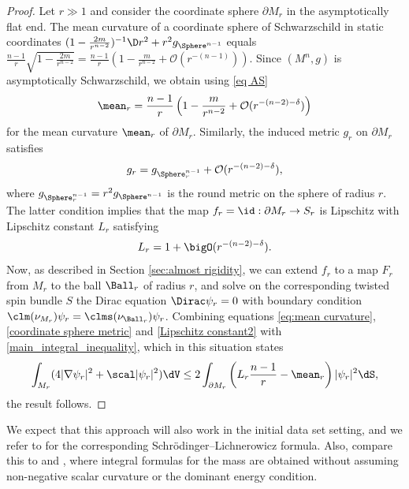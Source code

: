 \documentclass[a4paper,11pt]{amsart}
\numberwithin{equation}{section}
\begin{document}
\begin{proof}
Let $r\gg1$ and consider the coordinate sphere $\partial M_r$ in the asymptotically flat end. 
The mean curvature of a coordinate sphere of Schwarzschild in static coordinates $(1-\tfrac{2m}{r^{n-2}})^{-1}\D r^2+r^2g_{\Sphere^{n-1}}$ equals $\tfrac{n-1}r\sqrt{1-\tfrac{2m}{r^{n-2}}}=\tfrac{n-1}r(1-\frac{m}{r^{n-2}}+\mathcal O(r^{-(n-1)}))$.
Since $(M^n,g)$ is asymptotically Schwarzschild, we obtain using \eqref{eq AS} 
\begin{align}\label{eq:mean curvature}
    \mean_r=\frac{n-1}r\left(1-\frac{m}{r^{n-2}}+\mathcal O(r^{-(n-2)-\delta})      \right)
\end{align}
for the mean curvature $\mean_r$ of $\partial M_r$.
Similarly, the induced metric $g_r$ on $\partial M_r$ satisfies
\begin{align}\label{coordinate sphere metric}
 g_r=g_{\Sphere^{n-1}_r}+\mathcal O(r^{-(n-2)-\delta}),
\end{align}
where $g_{\Sphere^{n-1}_r}=r^2g_{\Sphere^{n-1}}$ is the round metric on the sphere of radius $r$.
The latter condition implies that the map $f_r=\id:\partial M_r\to S_r$ is Lipschitz with Lipschitz constant $L_r$ satisfying 
\begin{align}\label{Lipschitz constant2}
    L_r=1+\mathcal \bigO(r^{-(n-2)-\delta}).
\end{align}
Now, as described in Section \ref{sec:almost rigidity}, we can extend $f_r$ to a map $F_r$ from $M_r$ to the ball $\Ball_r$ of radius $r$, and solve on the corresponding twisted spin bundle \(S\) the Dirac equation $\Dirac \psi_r=0$ with boundary condition \(\clm(\nu_{M_r}) \psi_r =  \clms(\nu_{\Ball_r}) \psi_r \).
 Combining equations \eqref{eq:mean curvature}, \eqref{coordinate sphere metric} and \eqref{Lipschitz constant2} with \cref{main_integral_inequality}, which in this situation states
    \begin{align*}
        \int_{M_r}(4|\nabla \psi_r|^2+\scal|\psi_r|^2)\dV\le2\int_{\partial M_r}\left(L_r\frac{n-1}r-\mean_r\right)|\psi_r|^2\dS,
    \end{align*}
    the result follows.
\end{proof}


We expect that this approach will also work in the initial data set setting, and we refer to \cite{brendle2023rigidity} for the corresponding Schr\"odinger--Lichnerowicz formula.
Also, compare this to \cite{bray2022harmonic} and \cite{hirsch2022spacetime}, where integral formulas for the mass are obtained without assuming non-negative scalar curvature or the dominant energy condition.
\end{document}
